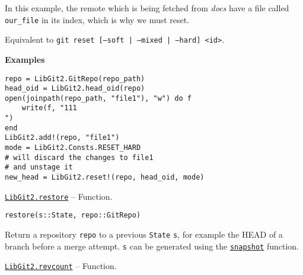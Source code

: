 \begin{adjustwidth}{2em}{0pt}
In this example, the remote which is being fetched from \emph{does} have a file called \texttt{our\_file} in its index, which is why we must reset.

Equivalent to \texttt{git reset [--soft | --mixed | --hard] <id>}.

\textbf{Examples}


\begin{verbatim}
repo = LibGit2.GitRepo(repo_path)
head_oid = LibGit2.head_oid(repo)
open(joinpath(repo_path, "file1"), "w") do f
    write(f, "111
")
end
LibGit2.add!(repo, "file1")
mode = LibGit2.Consts.RESET_HARD
# will discard the changes to file1
# and unstage it
new_head = LibGit2.reset!(repo, head_oid, mode)
\end{verbatim}



\end{adjustwidth}
\hypertarget{1068934750891016732}{} 
\hyperlink{1068934750891016732}{\texttt{LibGit2.restore}}  -- {Function.}

\begin{adjustwidth}{2em}{0pt}


\begin{verbatim}
restore(s::State, repo::GitRepo)
\end{verbatim}

Return a repository \texttt{repo} to a previous \texttt{State} \texttt{s}, for example the HEAD of a branch before a merge attempt. \texttt{s} can be generated using the \hyperlink{5664620894068288269}{\texttt{snapshot}} function.



\end{adjustwidth}
\hypertarget{3220704891875596639}{} 
\hyperlink{3220704891875596639}{\texttt{LibGit2.revcount}}  -- {Function.}

